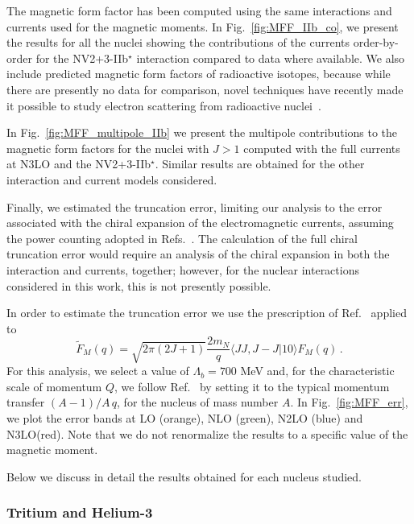 \documentclass[aps,prc,floatfix,showpacs,twocolumn, preprintnumbers]{revtex4-2}
\begin{document}
The magnetic form factor has been computed using the same interactions and currents used for the magnetic moments. In Fig.~\ref{fig:MFF_IIb_co}, we present the results for all the nuclei showing the contributions of the currents order-by-order for the NV2+3-IIb$^\star$ interaction compared to data where available. We also include predicted magnetic form factors of radioactive isotopes, because while there are presently no data for comparison, novel techniques have recently made it possible to study electron scattering from radioactive nuclei~\cite{Tsukada:2023}. 

In Fig.~\ref{fig:MFF_multipole_IIb} we present the multipole contributions to the magnetic form factors for the nuclei with $J>1$ computed with the full currents at N3LO and the NV2+3-IIb$^\star$. Similar results are obtained for the other interaction and current models considered.

Finally, we estimated the truncation error, limiting our analysis to the error associated with the chiral expansion of the electromagnetic currents, assuming the power counting adopted in Refs.~\cite{Pastore:2008ui,Pastore:2009is,Pastore:2011ip,Piarulli:2012bn,Schiavilla:2018udt,Gnech:2022vwr}. The calculation of the full chiral truncation error would require an analysis of the chiral expansion in both the interaction and currents, together; however, for the nuclear interactions considered in this work, this is not presently possible.


In order to estimate the truncation error we use the prescription
of Ref.~\cite{Epelbaum:2014efa,Epelbaum:2014sza} applied to
\begin{equation}\label{eq:mff_tilde}
    \tilde F_M(q)=\sqrt{2\pi(2J+1)}\frac{2m_N}{q}\langle J J,J -\!J |1 0\rangle F_M(q)\,.
\end{equation}
 For this analysis, we select a value of $\Lambda_b=700$ MeV and, for the characteristic scale of momentum $Q$, we follow Ref.~\cite{Philips2016} by setting it to the typical momentum transfer $(A-1)/A\,q$, for the nucleus of mass number $A$.  
In Fig.~\ref{fig:MFF_err}, we plot the error bands at LO (orange), NLO (green), N2LO (blue) and N3LO(red). Note that  we do not renormalize the results to a specific value of the magnetic moment.

Below we discuss in detail the results obtained for each nucleus studied.

\subsubsection{Tritium and Helium-3}
\end{document}
